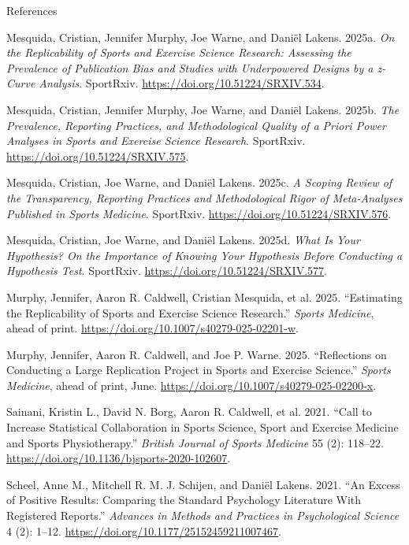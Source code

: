 \documentclass[
  ignorenonframetext,
]{beamer}
\newlength{\cslhangindent}
\newenvironment{CSLReferences}[2] %
 {\begin{list}{}{%
  \setlength{\itemindent}{0pt}
  \setlength{\leftmargin}{0pt}
  \setlength{\parsep}{0pt}
  \ifodd #1
   \setlength{\leftmargin}{\cslhangindent}
   \setlength{\itemindent}{-1\cslhangindent}
  \fi
  \setlength{\itemsep}{#2\baselineskip}}}
 {\end{list}}
\begin{document}
\begin{frame}[allowframebreaks]{References}
\begin{CSLReferences}{1}{1}
Mesquida, Cristian, Jennifer Murphy, Joe Warne, and Daniël Lakens.
2025a. \emph{On the Replicability of Sports and Exercise Science
Research: Assessing the Prevalence of Publication Bias and Studies with
Underpowered Designs by a z-Curve Analysis}. SportRxiv.
\url{https://doi.org/10.51224/SRXIV.534}.

Mesquida, Cristian, Jennifer Murphy, Joe Warne, and Daniël Lakens.
2025b. \emph{The Prevalence, Reporting Practices, and Methodological
Quality of a Priori Power Analyses in Sports and Exercise Science
Research}. SportRxiv. \url{https://doi.org/10.51224/SRXIV.575}.

Mesquida, Cristian, Joe Warne, and Daniël Lakens. 2025c. \emph{A Scoping
Review of the Transparency, Reporting Practices and Methodological Rigor
of Meta-Analyses Published in {Sports Medicine}}. SportRxiv.
\url{https://doi.org/10.51224/SRXIV.576}.

Mesquida, Cristian, Joe Warne, and Daniël Lakens. 2025d. \emph{What Is
Your Hypothesis? {On} the Importance of Knowing Your Hypothesis Before
Conducting a Hypothesis Test}. SportRxiv.
\url{https://doi.org/10.51224/SRXIV.577}.

{Murphy, Jennifer, Aaron R. Caldwell, Cristian Mesquida, et al.} 2025.
{``Estimating the {Replicability} of {Sports} and {Exercise Science
Research}.''} \emph{Sports Medicine}, ahead of print.
\url{https://doi.org/10.1007/s40279-025-02201-w}.

Murphy, Jennifer, Aaron R. Caldwell, and Joe P. Warne. 2025.
{``Reflections on {Conducting} a {Large Replication Project} in {Sports}
and {Exercise Science}.''} \emph{Sports Medicine}, ahead of print, June.
\url{https://doi.org/10.1007/s40279-025-02200-x}.

Sainani, Kristin L., David N. Borg, Aaron R. Caldwell, et al. 2021.
{``Call to Increase Statistical Collaboration in Sports Science, Sport
and Exercise Medicine and Sports Physiotherapy.''} \emph{British Journal
of Sports Medicine} 55 (2): 118--22.
\url{https://doi.org/10.1136/bjsports-2020-102607}.

Scheel, Anne M., Mitchell R. M. J. Schijen, and Daniël Lakens. 2021.
{``An {Excess} of {Positive Results}: {Comparing} the {Standard
Psychology Literature With Registered Reports}.''} \emph{Advances in
Methods and Practices in Psychological Science} 4 (2): 1--12.
\url{https://doi.org/10.1177/25152459211007467}.


\end{CSLReferences}
\end{frame}
\end{document}
